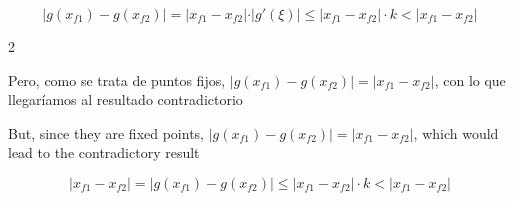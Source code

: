 \begin{equation*}
\vert g(x_{f1})-g(x_{f2}) \vert =\vert x_{f1}-x_{f2} \vert\cdot \vert g'(\xi) \vert \leq \vert x_{f1}-x_{f2} \vert \cdot k < \vert x_{f1}-x_{f2} \vert
\end{equation*}

\begin{paracol}{2}

Pero, como se trata de puntos fijos, $\vert g(x_{f1})-g(x_{f2}) \vert =\vert x_{f1}-x_{f2}\vert $, con lo que llegaríamos al resultado contradictorio

\switchcolumn

But, since they are fixed points, $\vert g(x_{f1})-g(x_{f2}) \vert =\vert x_{f1}-x_{f2} \vert$, which would lead to the contradictory result

\end{paracol}

 \begin{equation*}
\vert x_{f1}-x_{f2}\vert=\vert g(x_{f1})-g(x_{f2}) \vert  \leq \vert x_{f1}-x_{f2} \vert\cdot k < \vert x_{f1}-x_{f2} \vert
\end{equation*}

